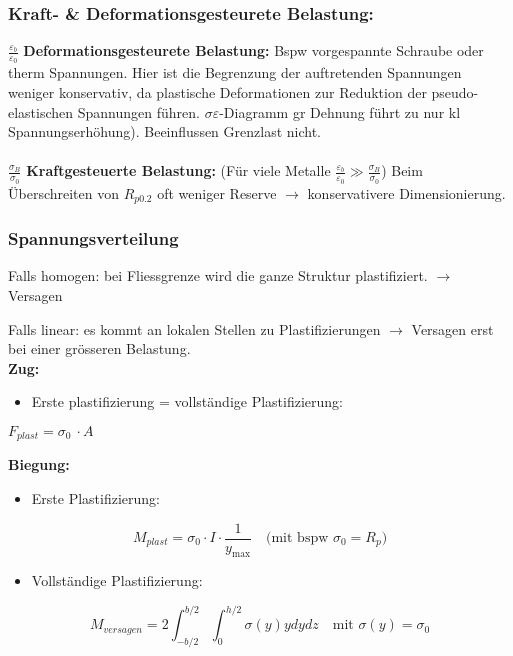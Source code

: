             \subsubsection{Kraft- \& Deformationsgesteurete Belastung:}
            $\frac{\varepsilon_b}{\varepsilon_0}$ \textbf{Deformationsgesteurete Belastung:} Bspw vorgespannte Schraube oder therm Spannungen. Hier ist die Begrenzung der auftretenden Spannungen weniger konservativ, da plastische Deformationen zur Reduktion der pseudo-elastischen Spannungen führen. $\sigma\varepsilon$-Diagramm gr Dehnung führt zu nur kl Spannungserhöhung). Beeinflussen Grenzlast nicht.\\\\ 
            $\frac{\sigma_B}{\sigma_0}$ \textbf{Kraftgesteuerte Belastung:} (Für viele Metalle $\frac{\varepsilon_b}{\varepsilon_0} \gg \frac{\sigma_B}{\sigma_0}$) Beim Überschreiten von $R_{p0.2}$ oft weniger Reserve $\rightarrow$ konservativere Dimensionierung.
        
        \subsubsection{Spannungsverteilung}
            Falls homogen: bei Fliessgrenze wird die ganze Struktur plastifiziert. $\rightarrow$ Versagen %
              
            Falls linear: es kommt an lokalen Stellen zu Plastifizierungen $\rightarrow$ Versagen erst bei einer grösseren Belastung.\\
            \textbf{Zug:}
            \vspace{-2mm}
            \begin{itemize}
                \item Erste plastifizierung = vollständige Plastifizierung:
            \end{itemize}
            \vspace{-2mm}
            \begin{center}
                $\displaystyle F_{plast} = \sigma_0\ \cdot A$
            \end{center}
            
            \vspace{-4mm}
\vfill\null\columnbreak
            \textbf{Biegung:}
            \vspace{-2mm}
            \begin{itemize}
                \item Erste Plastifizierung:
            \end{itemize}
            \[M_{plast} = \sigma_0\cdot I\cdot\frac{1}{y_{\textrm{max}}} \quad\textrm{(mit bspw $\sigma_0 = R_p$)}\]
            \begin{itemize}
                \item Vollständige Plastifizierung:
            \end{itemize}
            \[M_{versagen} = 2\int_{-b/2}^{b/2}\int_{0}^{h/2}\sigma(y)ydydz \quad\textrm{mit $\sigma(y) = \sigma_0$}\]
            

